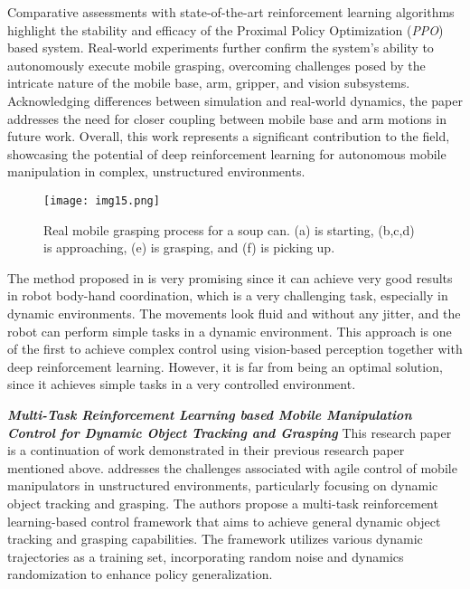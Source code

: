 Comparative assessments with state-of-the-art reinforcement learning algorithms highlight
the stability and efficacy of the Proximal Policy Optimization (\textit{PPO}) based system.
Real-world experiments further confirm the system's ability to autonomously execute mobile grasping,
overcoming challenges posed by the intricate nature of the mobile base, arm, gripper, and vision subsystems.
Acknowledging differences between simulation and real-world dynamics, the paper addresses
the need for closer coupling between mobile base and arm motions in future work. Overall,
this work represents a significant contribution to the field, showcasing the potential of
deep reinforcement learning for autonomous mobile manipulation in complex, unstructured environments.

\begin{figure}[t]
	\centering
	\texttt{[image: img15.png]}
	\captionsetup{width=1\linewidth}
	\caption{Real mobile grasping process for a soup can.
		(a) is starting, (b,c,d) is approaching, (e) is grasping, and (f) is picking up.
		\cite{wang2020drlmanipulation}}
	\label{fig:img15}
\end{figure}

The method proposed in \cite{wang2020drlmanipulation} is very promising since it can
achieve very good results in robot body-hand coordination, which is a very challenging task,
especially in dynamic environments. The movements look fluid and without any jitter,
and the robot can perform simple tasks in a dynamic environment. This approach is one of the first
to achieve complex control using vision-based perception together with deep reinforcement
learning. However, it is far from being an optimal solution, since it achieves simple
tasks in a very controlled environment.

\textbf{\textit{Multi-Task Reinforcement Learning based Mobile Manipulation
		Control for Dynamic Object Tracking and Grasping}} \quad
This research paper \cite{wang2022multitask} is a continuation of work demonstrated in
their previous research paper \cite{wang2020drlmanipulation} mentioned above.
\cite{wang2022multitask} addresses the challenges associated with
agile control of mobile manipulators in unstructured environments, particularly focusing
on dynamic object tracking and grasping. The authors propose a multi-task reinforcement
learning-based control framework that aims to achieve general dynamic object tracking and
grasping capabilities. The framework utilizes various dynamic trajectories as a training set,
incorporating random noise and dynamics randomization to enhance policy generalization.

